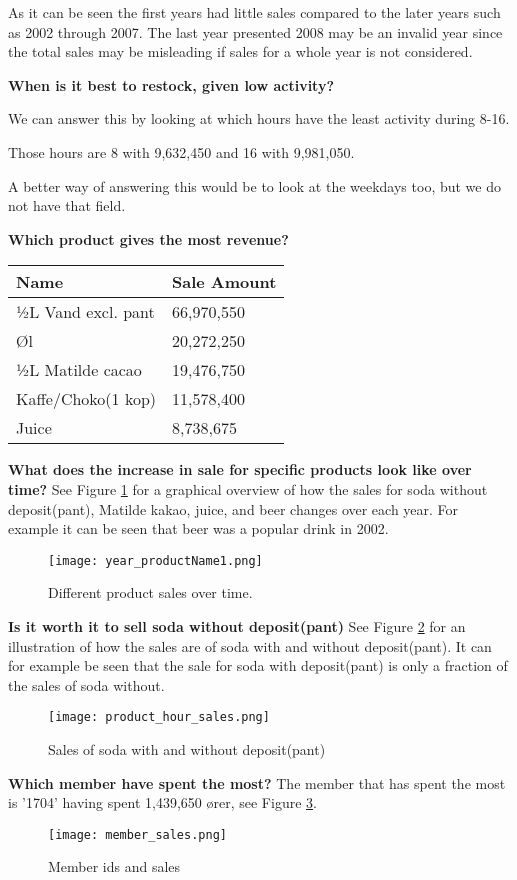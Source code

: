 	As it can be seen the first years had little sales compared to the later years such as 2002 through 2007. The last year presented 2008 may be an invalid
	year since the total sales may be misleading if sales for a whole year is not considered.

	\textbf{When is it best to restock, given low activity?}
	
	We can answer this by looking at which hours have the least activity during 8-16.
	
	Those hours are 8 with 9,632,450 and 16 with 9,981,050.
	
	A better way of answering this would be to look at the weekdays too, but we do not have that field.
	
	\textbf{Which product gives the most revenue?}
	\begin{table}[H]
	    \begin{tabular}{l|l}
	    Name               & Sale Amount \\ \hline
	    ½L Vand excl. pant & 66,970,550  \\
	    Øl                 & 20,272,250  \\
	    ½L Matilde cacao   & 19,476,750  \\
	    Kaffe/Choko(1 kop) & 11,578,400  \\
	    Juice              & 8,738,675   \\
	    \end{tabular}
	\end{table}
	
	\textbf{What does the increase in sale for specific products look like over time?}
	See Figure \ref{fig:yearProduct} for a graphical overview of how the sales for soda without deposit(pant), Matilde kakao, juice, and beer changes over each year. For example it can be seen that beer was a popular drink in 2002.
	
	\begin{figure}
		\centering
		\texttt{[image: year\_productName1.png]}
		\caption{Different product sales over time.}
		\label{fig:yearProduct}
	\end{figure}
	
	\textbf{Is it worth it to sell soda without deposit(pant)}
	See Figure \ref{fig:sodaSales} for an illustration of how the sales are of soda with and without deposit(pant). It can for example be seen that the sale for soda with deposit(pant) is only a fraction of the sales of soda without.
	
	\begin{figure}
		\centering
		\texttt{[image: product\_hour\_sales.png]}
		\caption{Sales of soda with and without deposit(pant)}
		\label{fig:sodaSales}
	\end{figure}
	
	\textbf{Which member have spent the most?}
	The member that has spent the most is '1704' having spent 1,439,650 ører, see Figure \ref{fig:memberSales}.
	
	\begin{figure}
		\centering
		\texttt{[image: member\_sales.png]}
		\caption{Member ids and sales}
		\label{fig:memberSales}
	\end{figure}

